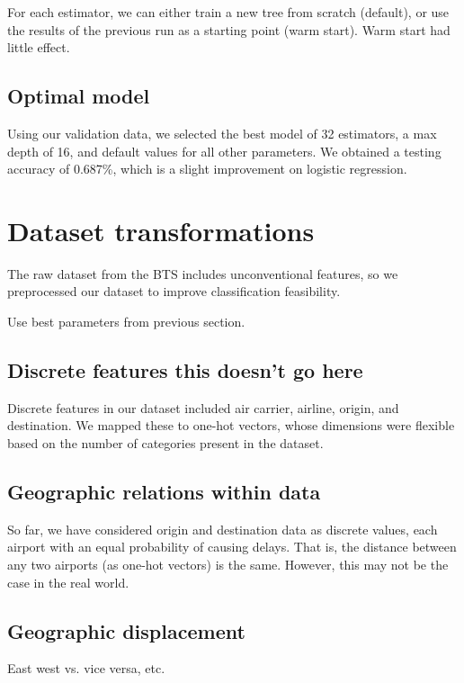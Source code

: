 \documentclass{article}
\begin{document}
\begin{multicols}{2}
For each estimator,
we can either train a new tree from scratch (default),
or use the results of the previous run
as a starting point (warm start).
Warm start had little effect.

\subsection{Optimal model}

Using our validation data,
we selected the best model
of 32 estimators, a max depth of 16,
and default values for all other parameters.
We obtained a testing accuracy of 0.687\%,
which is a slight improvement on logistic regression.

\section{Dataset transformations}
\label{sec:dataset}

The raw dataset from the BTS
includes unconventional features,
so we preprocessed our dataset
to improve classification feasibility.

Use best parameters from previous section.

\subsection{Discrete features this doesn't go here}

Discrete features in our dataset included
air carrier, airline, origin, and destination.
We mapped these to one-hot vectors,
whose dimensions were flexible based on
the number of categories present in the dataset.


\subsection{Geographic relations within data}

So far, we have considered origin and destination data
as discrete values,
each airport with an equal probability of causing delays.
That is, the distance between any two airports
(as one-hot vectors) is the same.
However, this may not be the case in the real world.

\subsection{Geographic displacement}

East west vs. vice versa, etc.


\end{multicols}
\end{document}

